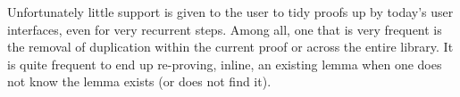 Unfortunately little support is given to the user to tidy proofs up by today's
user interfaces, even for very recurrent steps.  Among all, one that is very
frequent is the removal of duplication within the current proof or across the
entire library.  It is quite frequent to end up re-proving, inline, an existing
lemma when one does not know the lemma exists (or does not find it).

% 
% 
% 
% 
% 
% 
% 
% 
% 
% 
